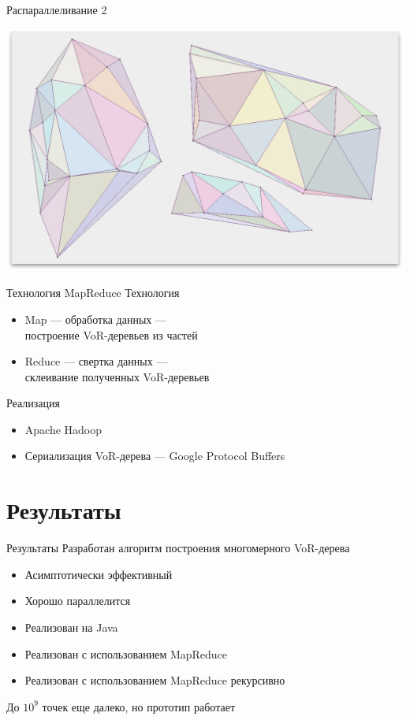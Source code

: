 \documentclass[14pt, fleqn, xcolor={dvipsnames, table}]{beamer}
\begin{document}
        \begin{frame}{Распараллеливание 2}
            \begin{center}
                \includegraphics[scale=0.295]{5.png}
            \end{center}            
        \end{frame}
        
        \begin{frame}{Технология MapReduce}
            Технология
            \begin{itemize}
                \item Map --- обработка данных --- \\ построение VoR-деревьев из частей 
                \item Reduce --- свертка данных --- \\ склеивание полученных VoR-деревьев
            \end{itemize} 
            Реализация
            \begin{itemize}
                \item Apache Hadoop
                \item Сериализация VoR-дерева --- Google Protocol Buffers
            \end{itemize}              
        \end{frame}
        
    \section{Результаты}
    
        \begin{frame}{Результаты}
            Разработан алгоритм построения многомерного VoR-дерева
            \begin{itemize}
                \item Асимптотически эффективный 
                \item Хорошо параллелится
                \item Реализован на Java
                \item Реализован с использованием MapReduce
                \item Реализован с использованием MapReduce рекурсивно
            \end{itemize}
            До $10^9$ точек еще далеко, но прототип работает
        \end{frame}
        
\end{document}
